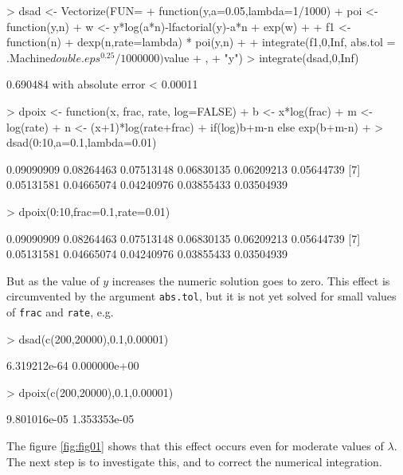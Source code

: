 \documentclass{article}
\newcommand{\code}[1]{\texttt{#1}}
\begin{document}
\begin{Schunk}
\begin{Sinput}
> dsad <- Vectorize(FUN=
+                   function(y,a=0.05,lambda=1/1000){
+                     poi <- function(y,n){
+                       w <- y*log(a*n)-lfactorial(y)-a*n
+                       exp(w)
+                     }
+                     f1 <- function(n){
+                       dexp(n,rate=lambda) * poi(y,n)
+                     }
+                     integrate(f1,0,Inf, abs.tol = .Machine$double.eps^0.25/1000000)$value
+                   },
+                   "y")
> integrate(dsad,0,Inf)
\end{Sinput}
\begin{Soutput}
0.690484 with absolute error < 0.00011
\end{Soutput}
\begin{Sinput}
> dpoix <- function(x, frac, rate, log=FALSE) {
+ 	  b <- x*log(frac)
+ 	  m <- log(rate)
+ 	  n <- (x+1)*log(rate+frac)
+           if(log)b+m-n else exp(b+m-n)
+         }
> dsad(0:10,a=0.1,lambda=0.01)
\end{Sinput}
\begin{Soutput}
 [1] 0.09090909 0.08264463 0.07513148 0.06830135 0.06209213 0.05644739
 [7] 0.05131581 0.04665074 0.04240976 0.03855433 0.03504939
\end{Soutput}
\begin{Sinput}
> dpoix(0:10,frac=0.1,rate=0.01)
\end{Sinput}
\begin{Soutput}
 [1] 0.09090909 0.08264463 0.07513148 0.06830135 0.06209213 0.05644739
 [7] 0.05131581 0.04665074 0.04240976 0.03855433 0.03504939
\end{Soutput}
\end{Schunk}

But as the value of $y$ increases the numeric solution goes to zero. This effect is circumvented by the argument \code{abs.tol}, but it is not yet solved for small values of \code{frac} and \code{rate}, e.g.

\begin{Schunk}
\begin{Sinput}
> dsad(c(200,20000),0.1,0.00001)
\end{Sinput}
\begin{Soutput}
[1] 6.319212e-64 0.000000e+00
\end{Soutput}
\begin{Sinput}
> dpoix(c(200,20000),0.1,0.00001)
\end{Sinput}
\begin{Soutput}
[1] 9.801016e-05 1.353353e-05
\end{Soutput}
\end{Schunk}
The figure \ref{fig:fig01} shows that this effect occurs even for moderate values of $\lambda$. The next step is to investigate this, and to correct the numerical integration.
\end{document}
